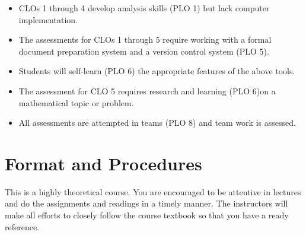 \documentclass[a4paper]{article}
\begin{document}
\begin{itemize}
\item CLOs 1 through 4 develop analysis skills (PLO 1) but lack computer implementation.
\item The assessments for CLOs 1 through 5 require working with a formal document preparation system and a version control system (PLO 5).
\item Students will self-learn (PLO 6) the appropriate features of the above tools.
\item The assessment for CLO 5 requires research and learning (PLO 6)on a mathematical topic or problem.
\item All assessments are attempted in teams (PLO 8) and team work is assessed.
\end{itemize}


\section{Format and Procedures}


This is a highly theoretical course. You are encouraged to be attentive in lectures and do the assignments and readings in a timely manner. The instructors will make all efforts to closely follow the course textbook so that you have a ready reference. 
\end{document}
